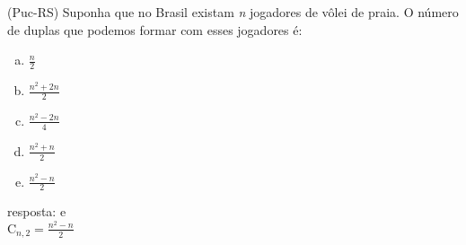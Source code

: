 \begin{ex}
(Puc-RS) Suponha que no Brasil existam \textit{n} jogadores de vôlei de praia. O número de duplas que podemos formar com esses jogadores é:
   \begin{enumerate}[(a)]
   \item $\frac{n}{2}$
   \item $\frac{n^2+2n}{2}$
   \item $\frac{n^2-2n}{4}$
   \item $\frac{n^2+n}{2}$
   \item $\frac{n^2-n}{2}$
   \end{enumerate}
    \begin{sol}
      resposta: e \\
      $\mathrm{C}_{n,2}=\frac{n^2-n}{2}$
    \end{sol}
\end{ex}